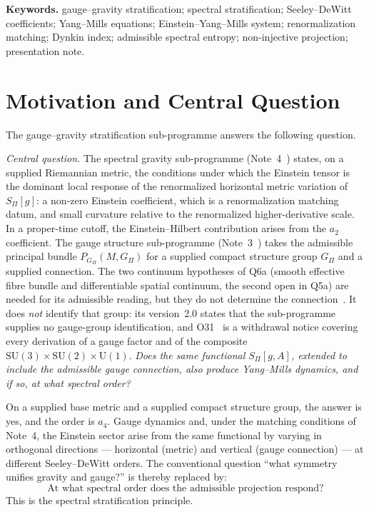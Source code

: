 \documentclass[11pt,a4paper]{article}
\theoremstyle{definition}
\newcommand{\SU}{\mathrm{SU}}
\newcommand{\UU}{\mathrm{U}}
\newcommand{\SPI}{S_\Pi}
\newcommand{\Gpi}{G_\Pi}
\begin{document}
  \medskip
  \noindent\textbf{Keywords.}
  gauge--gravity stratification; spectral stratification; Seeley--DeWitt coefficients; Yang--Mills
  equations; Einstein--Yang--Mills system; renormalization matching; Dynkin index; admissible
  spectral entropy; non-injective projection; presentation note.

  \newpage
  \tableofcontents

  \newpage

  \section{Motivation and Central Question}
    \label{sec:motivation}

    The gauge--gravity stratification sub-programme answers the following question.

    \medskip
    \noindent\textit{Central question.}
    The spectral gravity sub-programme (Note~4~\cite{Beau2026sgnote}) states, on a supplied Riemannian metric, the
    conditions under which the Einstein tensor is the dominant local response of the renormalized horizontal metric
    variation of $\SPI[g]$: a non-zero Einstein coefficient, which is a renormalization matching datum, and small
    curvature relative to the renormalized higher-derivative scale.
    In a proper-time cutoff, the Einstein--Hilbert contribution arises from the $a_2$ coefficient.
    The gauge structure sub-programme (Note~3~\cite{Beau2026gsnote}) takes the admissible
    principal bundle $P_{\Gpi}(M, \Gpi)$ for a supplied compact structure group $\Gpi$ and a
    supplied connection.
    The two continuum hypotheses of Q6a (smooth effective fibre bundle and differentiable spatial
    continuum, the second open in Q5a) are needed for its admissible reading, but they do not
    determine the connection~\cite{Beau2026q6a}.
    It does \emph{not} identify that group: its version~2.0 states that the sub-programme supplies
    no gauge-group identification, and O31~\cite{Beau2026a35} is a withdrawal notice covering every
    derivation of a gauge factor and of the composite
    $\SU(3) \times \SU(2) \times \UU(1)$.
    \textit{Does the same functional $\SPI[g,A]$, extended to include the admissible gauge
    connection, also produce Yang--Mills dynamics, and if so, at what spectral order?}

    \medskip
    On a supplied base metric and a supplied compact structure group, the answer is yes, and the order is $a_4$.
    Gauge dynamics and, under the matching conditions of Note~4, the Einstein sector arise from the same
    functional by varying in orthogonal directions --- horizontal (metric) and vertical (gauge connection) --- at
    different Seeley--DeWitt orders.
    The conventional question ``what symmetry unifies gravity and gauge?'' is thereby
    replaced by:
    \[
      \text{At what spectral order does the admissible projection respond?}
    \]
    This is the spectral stratification principle.
\end{document}
